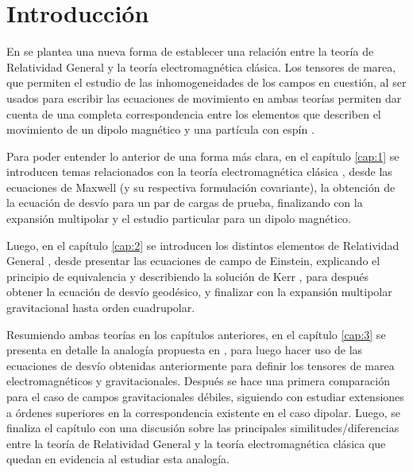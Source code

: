 \chapter*{Introducci\'on}

En \cite{Costa-Herdeiro} se plantea una nueva forma de establecer una relación entre la teoría de Relatividad General y la teoría electromagnética clásica. Los tensores de marea, que permiten el estudio de las inhomogeneidades de los campos en cuestión, al ser usados para escribir las ecuaciones de movimiento en ambas teorías permiten dar cuenta de una completa correspondencia entre los elementos que describen el movimiento de un dipolo magnético y una partícula con espín \cite{Steinhoff-Puetzfeld}.

Para poder entender lo anterior de una forma más clara, en el capítulo \ref{cap:1} se introducen temas relacionados con la teoría electromagnética clásica \cite{gr2}, desde las ecuaciones de Maxwell (y su respectiva formulación covariante), la obtención de la ecuación de desvío para un par de cargas de prueba, finalizando con la expansión multipolar \cite{Dixon1,Dixon2,Dixon3} y el estudio particular para un dipolo magnético.

Luego, en el capítulo \ref{cap:2} se introducen los distintos elementos de Relatividad General \cite{gr1,inverno,Steven,Hans,Poisson}, desde presentar las ecuaciones de campo de Einstein, explicando el principio de equivalencia y describiendo la solución de Kerr \cite{Heinicke}, para después obtener la ecuación de desvío geodésico, y finalizar con la expansión multipolar gravitacional hasta orden cuadrupolar.

Resumiendo ambas teorías en los capítulos anteriores, en el capítulo \ref{cap:3} se presenta en detalle la analogía propuesta en \cite{Costa-Herdeiro}, para luego hacer uso de las ecuaciones de desvío obtenidas anteriormente para definir los tensores de marea electromagnéticos y gravitacionales. Después se hace una primera comparación para el caso de campos gravitacionales débiles, siguiendo con estudiar extensiones a órdenes superiores en la correspondencia existente en el caso dipolar. Luego, se finaliza el capítulo con una discusión sobre las principales similitudes/diferencias entre la teoría de Relatividad General y la teoría electromagnética clásica que quedan en evidencia al estudiar esta analogía.